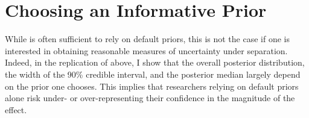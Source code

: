 \documentclass[12pt]{article}
\begin{document}

%

\section*{Choosing an Informative Prior}

While is often sufficient to rely on default priors, this is not the case if one is interested in obtaining reasonable measures of uncertainty under separation. Indeed, in the replication of \cite{BarrilleauxRainey2014} above, I show that the overall posterior distribution, the width of the 90\% credible interval, and the posterior median largely depend on the prior one chooses. This implies that researchers relying on default priors alone risk under- or over-representing their confidence in the magnitude of the effect.
\end{document}
